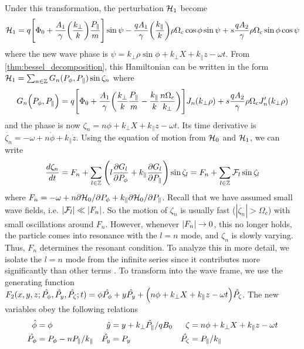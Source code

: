 Under this transformation, the perturbation $\mathcal{H}_1$ become
\begin{equation}
    \mathcal{H}_1=q\qty[\Phi_0+\frac{A_1}{\gamma}\qty(\frac{k_\bot}{k})\frac{P_\|}{m}]\sin\psi
    -\frac{qA_1}{\gamma}\qty(\frac{k_\|}{k})\rho\Omega_c\cos\phi\sin\psi
    +s\frac{qA_2}{\gamma}\rho\Omega_c\sin\phi\cos\psi
\end{equation}
where the new wave phase is $\psi=k_\bot\rho\sin\phi+k_\bot X+k_\|
z-\omega t$. From \cref{thm:bessel_decomposition}, this Hamiltonian can be
written in the form $\mathcal{H}_1=\sum_{n\in\mathbb{Z}}G_n(P_\phi,P_\|)\sin\zeta_n$
where
\begin{equation}
    G_n\qty(P_\phi,P_\|)=q\qty[\Phi_0+\frac{A_1}{\gamma}\qty(\frac{k_\perp}{k}\frac{P_{\|}}{m}-\frac{k_{\|}}{k}\frac{n\Omega_c}{k_\perp})]J_n\qty(k_\perp\rho)
    +s\frac{qA_2}{\gamma}\rho\Omega_cJ_n'\qty(k_\perp\rho)
\end{equation}
and the phase is now $\zeta_n=n\phi+k_\perp X+k_\|z-\omega t$. Its time
derivative is $\dot{\zeta_n}=-\omega+n\dot{\phi}+k_\|\dot{z}$. Using the
equation of motion from $\mathcal{H}_0$ and $\mathcal{H}_1$, we can write
\begin{equation}
    \frac{d\zeta_n}{dt}=F_n+\sum_{l\in\mathbb{Z}}\qty(l\frac{\partial G_l}{\partial
    P_\phi}+k_\|\frac{\partial G_l}{\partial P_\|})\sin\zeta_l
    =F_n+\sum_{l\in\mathbb{Z}}\mathcal{F}_l\sin\zeta_l
\end{equation}
where $F_n=-\omega+n\partial\mathcal{H}_0/\partial P_\phi+k_\|\partial\mathcal{H}_0/\partial
P_\|$. Recall that we have
assumed small wave fields, i.e. $\abs{\mathcal{F}_l}\ll\abs{F_n}$. So the
motion of $\zeta_n$ is usually fast ($|\dot{\zeta_n}|>\Omega_c$) with small
oscillations around $F_n$. However, whenever $\abs{F_n}\to0$, this no longer holds, the particle comes into resonance with the $l=n$ mode, and $\zeta_n$ is slowly varying. Thus, $F_n$ determines the resonant condition. To analyze this in more detail, we isolate the $l=n$ mode from the infinite series since it contributes more significantly than other terms \citep{Albert2000}. To transform into the wave frame, we use the generating function $F_2(x,y,z;\hat{P_\phi},\hat{P_y},\hat{P_\zeta};t)=\phi \hat{P_\phi}+y\hat{P_y}+\qty(n\phi+k_\perp X+k_\|z-\omega t)\hat{P_\zeta}$. The new variables obey the following relations
\begin{align}
    \hat{\phi}&=\phi & \hat{y}&=y+k_\perp\hat{P_\|}/qB_0 & \zeta&=n\phi+k_\perp
    X+k_\| z-\omega t\notag\\
    \hat{P_\phi}&=P_\phi-nP_\|/k_\| &
    \hat{P_y}&=P_y&\hat{P_\zeta}&=P_\|/k_\|
\end{align}
